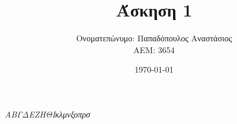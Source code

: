 \documentclass{article}
\title{Άσκηση 1}
\author{Ονοματεπώνυμο: Παπαδόπουλος Αναστάσιος \\ 
        ΑΕΜ: 3654}
\date{\today}
\begin{document}
\maketitle 
\begin{center}
    \vspace{5mm}
    \emph{\tiny Α\scriptsize Β\footnotesize Γ\small Δ\normalsize Ε\large Ζ\Large Η\LARGE Θ\huge Ι\huge κ\LARGE λ\Large μ\large ν\normalsize ξ\small ο\footnotesize π\scriptsize ρ\tiny σ}
\end{center}
\end{document}
